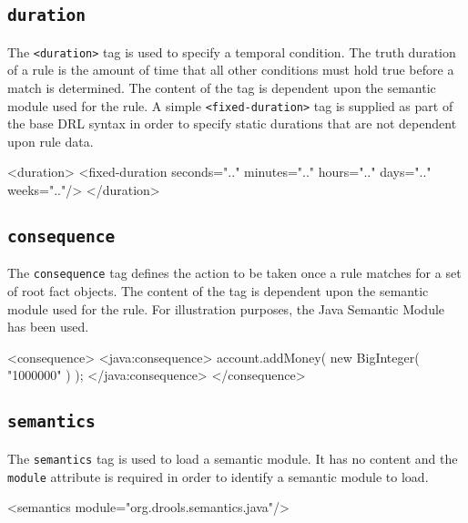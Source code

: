 \clearpage

\subsection{\texttt{duration}}

The \verb|<duration>| tag is used to specify a temporal condition.
The truth duration of a rule is the amount of time that all other
conditions must hold true before a match is determined.  The
content of the tag is dependent upon the semantic module used
for the rule. A simple \verb|<fixed-duration>| tag is supplied as
part of the base DRL syntax in order to specify static durations
that are not dependent upon rule data.

\begin{codelisting}
<duration>
  <fixed-duration seconds=".."
                  minutes=".."
                  hours=".."
                  days=".."
                  weeks=".."/>
</duration>
\end{codelisting}

\subsection{\texttt{consequence}}

The \verb|consequence| tag defines the action to be taken
once a rule matches for a set of root fact objects.  The content
of the tag is dependent upon the semantic module used for the rule.
For illustration purposes, the Java Semantic Module has been used.

\begin{codelisting}
<consequence>
\textcolor{light}{  <java:consequence>
    account.addMoney( new BigInteger( "1000000" ) );
  </java:consequence>}
</consequence>
\end{codelisting}


\subsection{\texttt{semantics}}

The \verb|semantics| tag is used to load a semantic module.
It has no content and the \verb|module| attribute is required
in order to identify a semantic module to load.

\begin{codelisting}
<semantics module="org.drools.semantics.java"/>
\end{codelisting}
